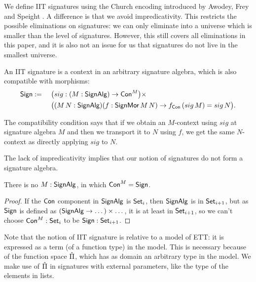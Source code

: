\documentclass[a4paper,UKenglish,cleveref, autoref]{lipics-v2019}
\begin{document}
We define IIT signatures using the Church encoding introduced by Awodey, Frey
and Speight \cite{DBLP:conf/lics/AwodeyFS18}. A difference is that we avoid
impredicativity. This restricts the possible eliminations on signatures: we can
only eliminate into a universe which is smaller than the level of
signatures. However, this still covers all eliminations in this paper, and it is
also not an issue for us that signatures do not live in the smallest universe.

\begin{definition}\label{defn:sign}
  An IIT signature is a context in an arbitrary signature algebra, which is also
  compatible with morphisms:
  \begin{alignat*}{6}
    & \mathsf{Sign} :=\,\, && \big({sig}:(M:\mathsf{SignAlg})\rightarrow\mathsf{Con}^M\big)\times \\
    & && \big((M\,N:\mathsf{SignAlg})(f:\mathsf{SignMor}\,M\,N)\rightarrow f_{\mathsf{Con}}\,({sig}\,M) = {sig}\,N \big).
  \end{alignat*}
\end{definition}
The compatibility condition says that if we obtain an $M$-context
using ${sig}$ at signature algebra $M$ and then we transport it to $N$ using $f$,
we get the same $N$-context as directly applying ${sig}$ to $N$.

The lack of impredicativity implies that our notion of signatures do not form a
signature algebra.
\begin{lemma}
  There is no $M : \mathsf{SignAlg}$, in which $\mathsf{Con}^M = \mathsf{Sign}$.
\end{lemma}
\begin{proof}
  If the $\mathsf{Con}$ component in $\mathsf{SignAlg}$ is $\mathsf{Set}_i$, then $\mathsf{SignAlg}$
  is in $\mathsf{Set}_{i+1}$, but as $\mathsf{Sign}$ is defined as
  $(\mathsf{SignAlg}\rightarrow\dots)\times\dots$, it is at least in $\mathsf{Set}_{i+1}$, so
  we can't choose $\mathsf{Con}^M : \mathsf{Set}_i$ to be $\mathsf{Sign} : \mathsf{Set}_{i+1}$.
\end{proof}

Note that the notion of IIT signature is relative to a model of ETT:
it is expressed as a term (of a function type) in the model. This is
necessary because of the function space $\hat{\Pi}$, which has as domain an
arbitrary type in the model. We make use of $\hat{\Pi}$ in signatures with
external parameters, like the type of the elements in lists.
\end{document}
